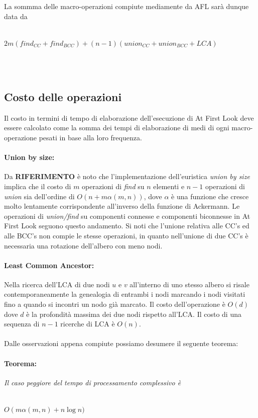 \documentclass[a4paper,11pt]{report}
\begin{document}
La sommma delle macro-operazioni compiute mediamente da AFL sarà dunque data da\\\\
\centerline{$2m\left(find_{CC}+find_{BCC}\right)+\left(n-1\right)\left(union_{CC}+union_{BCC}+LCA\right)$}\\\\
  
\subsection{Costo delle operazioni}
Il costo in termini di tempo di elaborazione dell'esecuzione di At First Look deve essere calcolato come la somma dei tempi di elaborazione
di medi di ogni 
macro-operazione pesati in base alla loro frequenza.
\paragraph{Union by size:} Da \textbf{RIFERIMENTO} è noto che l'implementazione dell'euristica \emph{union by size} implica che il costo di
$m$ operazioni 
di \emph{find} su $n$ elementi e $n-1$ operazioni di \emph{union} sia dell'ordine di $O\left(n+m\alpha\left(m,n\right)\right)$, dove
$\alpha$ è una funzione che cresce
molto lentamente corrispondente all'inverso della funzione di Ackermann. Le operazioni di \emph{union/find} su componenti connesse e
componenti 
biconnesse in At First Look seguono questo andamento. Si noti che l'unione relativa alle CC's ed alle BCC's non compie le stesse operazioni,
in quanto nell'unione di due
CC's è necessaria una rotazione dell'albero con meno nodi. 
\paragraph{Least Common Ancestor:}Nella ricerca dell'LCA di due nodi $u$ e $v$ all'interno di uno stesso albero si risale contemporaneamente
la genealogia di entrambi i nodi marcando
i nodi visitati fino a quando si incontri un nodo già marcato. Il costo dell'operazione è $O\left(d\right)$ dove $d$ è la profondità massima
dei due nodi rispetto all'LCA. 
Il costo di una sequenza di $n-1$ ricerche di LCA è $O\left(n\right)$.
\paragraph{}
Dalle osservazioni appena compiute possiamo desumere il seguente teorema:
\paragraph{Teorema:}\emph{Il caso peggiore del tempo di processamento complessivo è}\\\\
\centerline{$O\left(m\alpha\left(m,n\right)+n\log n\right.)$}
\end{document}
